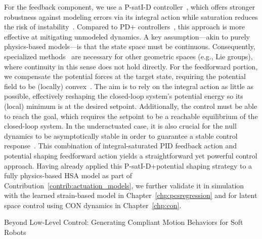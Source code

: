 %
For the feedback component, we use a P-satI-D controller~\citep{pustina2022p}, which offers stronger robustness against modeling errors via its integral action while saturation reduces the risk of instability~\citep{pustina2022p}. Compared to PD+ controllers~\citep{della2020model}, this approach is more effective at mitigating unmodeled dynamics.
%
A key assumption—akin to purely physics-based models—is that the state space must be continuous. Consequently, specialized methods~\citep{maithripala2015intrinsic} are necessary for other geometric spaces (e.g., Lie groups), where continuity in this sense does not hold directly.
%
For the feedforward portion, we compensate the potential forces at the target state, requiring the potential field to be (locally) convex~\citep{borja2022energy, della2023model}. The aim is to rely on the integral action as little as possible, effectively reshaping the closed-loop system’s potential energy so its (local) minimum is at the desired setpoint. 
Additionally, the control must be able to reach the goal, which requires the setpoint to be a reachable equilibrium of the closed-loop system. In the underactuated case, it is also crucial for the null dynamics to be asymptotically stable in order to guarantee a stable control response~\citep{borja2022energy}.
%
This combination of integral-saturated PID feedback action and potential shaping feedforward action yields a straightforward yet powerful control approach.
%
Having already applied this P-satI-D+potential shaping strategy to a fully physics-based \gls{HSA} model as part of Contribution~\ref{contrib:actuation_models}, we further validate it in simulation with the learned strain-based model in Chapter~\ref{chp:pcsregression} and for latent space control using \gls{CON} dynamics in Chapter~\ref{chp:con}.


\begin{contribution}\label{contrib:motion_behaviors}
    Beyond Low-Level Control: Generating Compliant Motion Behaviors for Soft Robots
\end{contribution}

